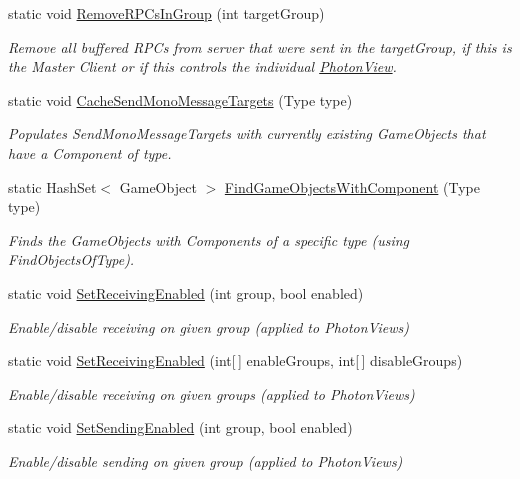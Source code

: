 \begin{DoxyCompactItemize}
static void \hyperlink{class_photon_network_ae6fd306fd4adf0c44d64d9cfadc038aa}{Remove\+R\+P\+Cs\+In\+Group} (int target\+Group)
\begin{DoxyCompactList}\small\item\em Remove all buffered R\+P\+Cs from server that were sent in the target\+Group, if this is the Master Client or if this controls the individual \hyperlink{class_photon_view}{Photon\+View}. \end{DoxyCompactList}\item 
static void \hyperlink{class_photon_network_adbb6045e5c8e64e0076cadbcb62703b5}{Cache\+Send\+Mono\+Message\+Targets} (Type type)
\begin{DoxyCompactList}\small\item\em Populates Send\+Mono\+Message\+Targets with currently existing Game\+Objects that have a Component of type. \end{DoxyCompactList}\item 
static Hash\+Set$<$ Game\+Object $>$ \hyperlink{class_photon_network_a89e99e64c1b6232132012bc311e7e205}{Find\+Game\+Objects\+With\+Component} (Type type)
\begin{DoxyCompactList}\small\item\em Finds the Game\+Objects with Components of a specific type (using Find\+Objects\+Of\+Type). \end{DoxyCompactList}\item 
static void \hyperlink{class_photon_network_af7728267e9576c7b2d205df53ac74fe1}{Set\+Receiving\+Enabled} (int group, bool enabled)
\begin{DoxyCompactList}\small\item\em Enable/disable receiving on given group (applied to Photon\+Views) \end{DoxyCompactList}\item 
static void \hyperlink{class_photon_network_ada44c5edfa6e93e67db635bd0764ef70}{Set\+Receiving\+Enabled} (int\mbox{[}$\,$\mbox{]} enable\+Groups, int\mbox{[}$\,$\mbox{]} disable\+Groups)
\begin{DoxyCompactList}\small\item\em Enable/disable receiving on given groups (applied to Photon\+Views) \end{DoxyCompactList}\item 
static void \hyperlink{class_photon_network_a8f8d6db18d74855e18ec43b3a221102b}{Set\+Sending\+Enabled} (int group, bool enabled)
\begin{DoxyCompactList}\small\item\em Enable/disable sending on given group (applied to Photon\+Views) \end{DoxyCompactList}\item 

\end{DoxyCompactItemize}
